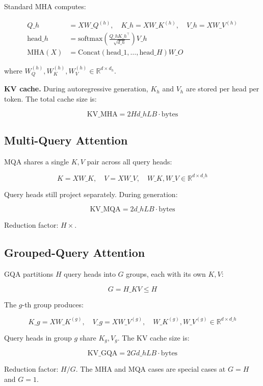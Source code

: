 Standard MHA computes:

\[
\begin{aligned}
Q\_h &= X W\_Q^{(h)}, \quad K\_h = X W\_K^{(h)}, \quad V\_h = X W\_V^{(h)} \\
\text{head}\_h &= \text{softmax}\!\left(\frac{Q\_h K\_h^\top}{\sqrt{d\_h}}\right) V\_h \\
\text{MHA}(X) &= \text{Concat}(\text{head}\_1, \dots, \text{head}\_H) W\_O
\end{aligned}
\tag{3.1}
\]

where $W_Q^{(h)}, W_K^{(h)}, W_V^{(h)} \in \mathbb{R}^{d \times d_h}$.

\textbf{KV cache.} During autoregressive generation, $K_h$ and $V_h$ are stored 
per head per token. The total cache size is:

\[
\text{KV}\_\text{MHA} = 2 H d\_h L B \cdot \text{bytes}
\tag{3.2}
\]

\subsection{Multi-Query Attention}

MQA shares a single $K, V$ pair across all query heads:

\[
K = X W\_K, \quad V = X W\_V, \quad W\_K, W\_V \in \mathbb{R}^{d \times d\_h}
\tag{3.3}
\]

Query heads still project separately. During generation:

\[
\text{KV}\_\text{MQA} = 2 d\_h L B \cdot \text{bytes}
\tag{3.4}
\]

Reduction factor: $H\times$.

\subsection{Grouped-Query Attention}

GQA partitions $H$ query heads into $G$ groups, each with its own $K, V$:

\[
G = H\_{KV} \le H
\tag{3.5}
\]

The $g$-th group produces:

\[
K\_g = X W\_K^{(g)}, \quad V\_g = X W\_V^{(g)}, \quad W\_K^{(g)}, W\_V^{(g)} \in \mathbb{R}^{d \times d\_h}
\tag{3.6}
\]

Query heads in group $g$ share $K_g, V_g$. The KV cache size is:

\[
\text{KV}\_\text{GQA} = 2 G d\_h L B \cdot \text{bytes}
\tag{3.7}
\]

Reduction factor: $H / G$. The MHA and MQA cases are special cases at 
$G = H$ and $G = 1$.


